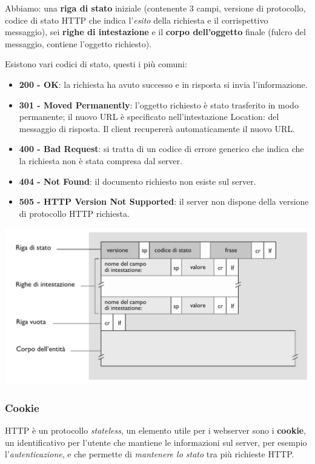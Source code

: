 Abbiamo: una \textbf{riga di stato} iniziale (contenente 3 campi, versione di protocollo, codice di stato HTTP che indica l'\textit{esito} della richiesta e il corrispettivo messaggio), sei \textbf{righe di intestazione} e il \textbf{corpo dell'oggetto} finale (fulcro del messaggio, contiene l'oggetto richiesto).

Esistono vari codici di stato, questi i più comuni:
\begin{itemize}
  \item \textbf{200 - OK}: la richiesta ha avuto successo e in risposta si invia l’informazione.
  \item \textbf{301 - Moved Permanently}: l’oggetto richiesto è stato trasferito in modo permanente; il nuovo URL è specificato nell’intestazione Location: del messaggio di risposta. Il client recupererà automaticamente il nuovo URL.
  \item \textbf{400 - Bad Request}: si tratta di un codice di errore generico che indica che la richiesta non è stata compresa dal server.
  \item \textbf{404 - Not Found}: il documento richiesto non esiste sul server.
  \item \textbf{505 - HTTP Version Not Supported}: il server non dispone della versione di protocollo HTTP richiesta.
\end{itemize}

\includegraphics[width=\textwidth]{./img/rispostahttp.png}

\subsubsection{Cookie}
HTTP è un protocollo \textit{stateless}, un elemento utile per i webserver sono i \textbf{cookie}, un identificativo per l'utente che mantiene le informazioni sul server, per esempio l'\textit{autenticazione}, e che permette di \textit{mantenere lo stato} tra più richieste HTTP. 

